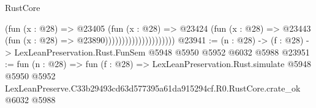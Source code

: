\begin{lexlean}{RustCore}
\begin{coremodule}
                                      (fun (x : @28) =>
                                      @23405
                                        (fun (x : @28) =>
                                        @23424
                                          (fun (x : @28) =>
                                          @23443 (fun (x : @28) => @23890)))))))))))))))))))))
@23941 := (n : @28) -> (f : @28) -> LexLeanPreservation.Rust.FunSem @5948 @5950 @5952 @6032 @5988
@23951 := fun (n : @28) =>
  fun (f : @28) =>
  LexLeanPreservation.Rust.simulate
    @5948
    @5950
    @5952
    LexLeanPreserve.C33b29493cd63d577395a61da915294cf.R0.RustCore.crate_ok
    @6032
    @5988
\end{coremodule}
\end{lexlean}
